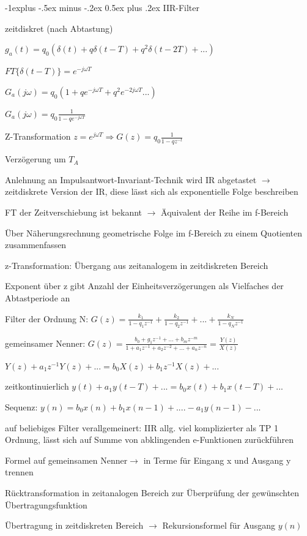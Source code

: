 \documentclass[a4paper]{article}
\makeatletter
\renewcommand{\subsection}{\@startsection{subsection}{2}{0mm}%
 {-1explus -.5ex minus -.2ex}%
 {0.5ex plus .2ex}%
 {\normalfont\normalsize\bfseries}}
\makeatother
\begin{document}
\begin{multicols}{3}
  \subsection{IIR-Filter}\label{iir-filter}
  \begin{itemize*}
    \item zeitdiskret (nach Abtastung)
    \begin{itemize*}
      \item $g_a(t)=q_0(\delta(t)+q\delta(t-T)+q^2\delta(t-2T)+...)$
      \item $FT\{\delta(t-T)\}=e^{-j\omega T}$
      \item $G_a(j\omega)=q_0(1+qe^{-j\omega T}+ q^2e^{-2j\omega T}...)$
      \item $G_a(j\omega)=q_0\frac{1}{1-qe^{-j\omega T}}$
      \item Z-Transformation $z=e^{j\omega T} \Rightarrow G(z)=q_0\frac{1}{1-qz^{-t}}$
      \item Verzögerung um $T_A$
    \end{itemize*}
    \item Anlehnung an Impulsantwort-Invariant-Technik wird IR abgetastet $\rightarrow$ zeitdiskrete Version der IR, diese lässt sich als exponentielle Folge beschreiben
    \item FT der Zeitverschiebung ist bekannt $\rightarrow$ Äquivalent der Reihe im f-Bereich
    \item Über Näherungsrechnung geometrische Folge im f-Bereich zu einem Quotienten zusammenfassen
    \item z-Transformation: Übergang aus zeitanalogem in zeitdiskreten Bereich
    \item Exponent über z gibt Anzahl der Einheitsverzögerungen als Vielfaches der Abtastperiode an
    \item Filter der Ordnung N: $G(z)=\frac{k_1}{1-q_1z^{-1}}+\frac{k_2}{1-q_2z^{-1}}+...+\frac{k_N}{1-q_Nz^{-1}}$
    \item gemeinsamer Nenner: $G(z)=\frac{b_0+g_1z^{-1}+...+b_mz^{-m}}{1+a_1z^{-1}+a_2z^{-2}+...+a_nz^{-n}}=\frac{Y(z)}{X(z)}$
    \item $Y(z)+a_1z^{-1} Y(z)+... =b_0X(z)+b_1z^{-1}X(z)+...$
    \item zeitkontinuierlich $y(t)+a_1y(t-T)+... = b_0x(t)+b_1x(t-T)+...$
    \item Sequenz: $y(n)=b_0x(n) +b_1x(n-1)+.... -a_1y(n-1)-...$
    \item auf beliebiges Filter verallgemeinert: IIR allg. viel komplizierter als TP 1 Ordnung, lässt sich auf Summe von abklingenden e-Funktionen zurückführen
    \item Formel auf gemeinsamen Nenner$\rightarrow$ in Terme für Eingang x und Ausgang y trennen
    \item Rücktransformation in zeitanalogen Bereich zur Überprüfung der gewünschten Übertragungsfunktion
    \item Übertragung in zeitdiskreten Bereich $\rightarrow$ Rekursionsformel für Ausgang $y(n)$
  \end{itemize*}


\end{multicols}
\end{document}
